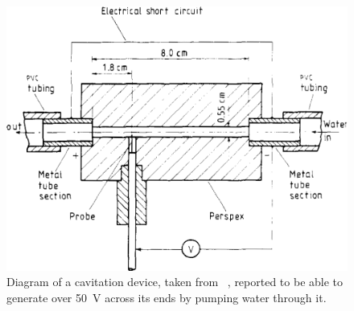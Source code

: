     \begin{figure}
      \centering
      \includegraphics{content/pt1/01-PowerHarvesting/graphics/VargaSeymour1986_cell}
      \caption{\label{fig:first_cell_diagram}Diagram of a cavitation device, taken from ~\cite{Varga1986}, reported to be able to generate over \SI{50}{\volt} across its ends by pumping water through it.}
    \end{figure}

